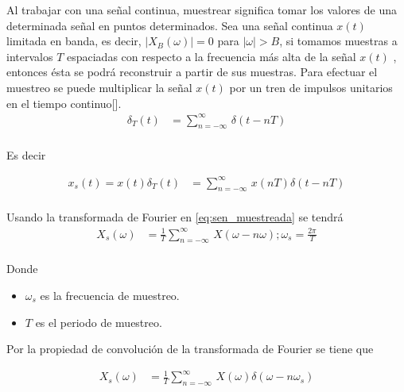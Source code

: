 \documentclass[12pt]{article}
\begin{document}
Al trabajar con una señal continua, muestrear significa tomar los valores de una determinada señal en puntos determinados. Sea una señal continua $x(t)$ limitada en banda, es decir, $|X_B(\omega)|=0$ para $|\omega|>B$, si tomamos muestras a intervalos $T$ espaciadas  con respecto a la frecuencia más alta de la señal $x(t)$ , entonces ésta se podrá reconstruir a partir de sus muestras. Para efectuar el muestreo se puede multiplicar  la señal $x(t)$ por un tren de impulsos unitarios en el tiempo continuo[\cite{escobar2009conceptos}].
\begin{equation}
    \begin{split}
        \delta_T(t)&=\displaystyle\sum_{n=-\infty}^{\infty}\,\delta(t-nT)\\
    \end{split}
    \label{eq:tren_deltas}
\end{equation}

Es decir 

\begin{equation}
    \begin{split}
        x_s(t)=x(t)\delta_T(t)&=\displaystyle\sum_{n=-\infty}^{\infty}\,x(nT)\delta(t-nT)\\
    \end{split}
    \label{eq:sen_muestreada}
\end{equation}

Usando la transformada de Fourier en \ref{eq:sen_muestreada} se tendrá
\begin{equation}
    \begin{split}
        X_s(\omega)&=\frac{1}{T}\displaystyle\sum_{n=-\infty}^{\infty}\,X(\omega-n\omega);\omega_s=\frac{2\pi}{T}\\
    \end{split}
    \label{eq:transfo_sen_muestreada}
\end{equation}

Donde
\begin{itemize}
    \item $\omega_s$ es la frecuencia de muestreo.
    \item $T$ es el periodo de muestreo.
\end{itemize}

Por la propiedad de convolución de la transformada de Fourier se tiene que 

\begin{equation}
    \begin{split}
        X_s(\omega)&=\frac{1}{T}\displaystyle\sum_{n=-\infty}^{\infty}\,X(\omega)\delta(\omega-n\omega_s)\\
    \end{split}
    \label{eq:espectro_muestreada}
\end{equation}
\end{document}
